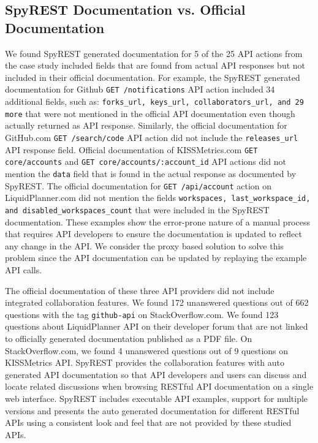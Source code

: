 \documentclass[conference]{IEEEtran}
\begin{document}
\subsection{SpyREST Documentation vs. Official Documentation} %
\label{sub:spyrest_vs_official_documentation}

We found SpyREST generated documentation for 5 of the 25 API actions from the case study included fields that are found from actual API responses but not included in their official documentation. For example, the SpyREST generated documentation for Github \texttt{GET /notifications} API action included 34 additional fields, such as: \texttt{forks\_url, keys\_url, collaborators\_url, and 29 more} that were not mentioned in the official API documentation even though actually returned as API response. Similarly, the official documentation for GitHub.com \texttt{GET /search/code} API action did not include the \texttt{releases\_url} API response field. Official documentation of KISSMetrics.com \texttt{GET core/accounts} and \texttt{GET core/accounts/:account\_id} API actions did not mention the \texttt{data} field that is found in the actual response as documented by SpyREST. The official documentation for \texttt{GET /api/account} action on LiquidPlanner.com did not mention the fields \texttt{workspaces, last\_workspace\_id, and disabled\_workspaces\_count} that were included in the SpyREST documentation. These examples show the error-prone nature of a manual process that requires API developers to ensure the documentation is updated to reflect any change in the API. We consider the proxy based solution to solve this problem since the API documentation can be updated by replaying the example API calls.

The official documentation of these three API providers did not include integrated collaboration features. We found 172 unanswered questions out of 662 questions with the tag \texttt{github-api} on StackOverflow.com. We found 123 questions about LiquidPlanner API on their developer forum that are not linked to officially generated documentation published as a PDF file. On StackOverflow.com, we found 4 unanswered questions out of 9 questions on KISSMetrics API. SpyREST provides the collaboration features with auto generated API documentation so that API developers and users can discuss and locate related discussions when browsing RESTful API documentation on a single web interface. SpyREST includes executable API examples, support for multiple versions and presents the auto generated documentation for different RESTful APIs using a consistent look and feel that are not provided by these studied APIs.
\end{document}
